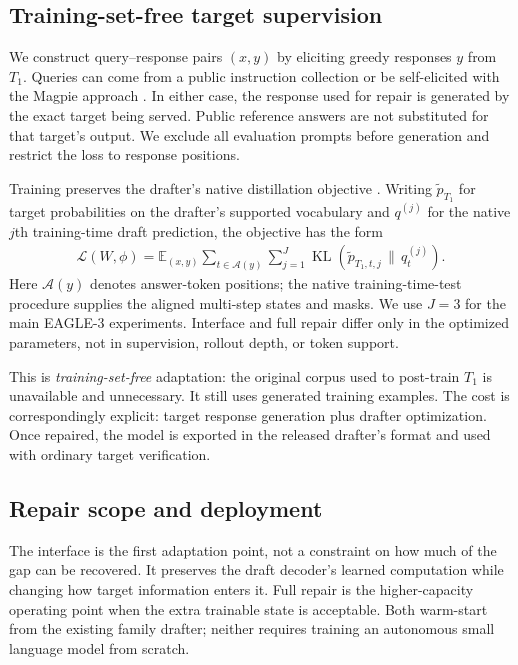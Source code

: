 \documentclass[11pt]{article}
\newcommand{\KL}{\operatorname{KL}}
\begin{document}
\subsection{Training-set-free target supervision}
We construct query--response pairs $(x,y)$ by eliciting greedy responses $y$ from $T_1$. Queries can come from a public instruction collection or be self-elicited with the Magpie approach \citep{magpie2024}. In either case, the response used for repair is generated by the exact target being served. Public reference answers are not substituted for that target's output. We exclude all evaluation prompts before generation and restrict the loss to response positions.

Training preserves the drafter's native distillation objective \citep{kd2015,eagle32025}. Writing $\widetilde p_{T_1}$ for target probabilities on the drafter's supported vocabulary and $q^{(j)}$ for the native $j$th training-time draft prediction, the objective has the form
\begin{equation}
\begin{split}
\mathcal L(W,\phi)=\mathbb E_{(x,y)}
\sum_{t\in\mathcal A(y)}\sum_{j=1}^{J}
\KL\!\left(\widetilde p_{T_1,t,j}\,\|\,q^{(j)}_{t}\right).
\end{split}
\label{eq:loss}
\end{equation}
Here $\mathcal A(y)$ denotes answer-token positions; the native training-time-test procedure supplies the aligned multi-step states and masks. We use $J=3$ for the main EAGLE-3 experiments. Interface and full repair differ only in the optimized parameters, not in supervision, rollout depth, or token support.

This is \emph{training-set-free} adaptation: the original corpus used to post-train $T_1$ is unavailable and unnecessary. It still uses generated training examples. The cost is correspondingly explicit: target response generation plus drafter optimization. Once repaired, the model is exported in the released drafter's format and used with ordinary target verification.

\subsection{Repair scope and deployment}
The interface is the first adaptation point, not a constraint on how much of the gap can be recovered. It preserves the draft decoder's learned computation while changing how target information enters it. Full repair is the higher-capacity operating point when the extra trainable state is acceptable. Both warm-start from the existing family drafter; neither requires training an autonomous small language model from scratch.
\end{document}
